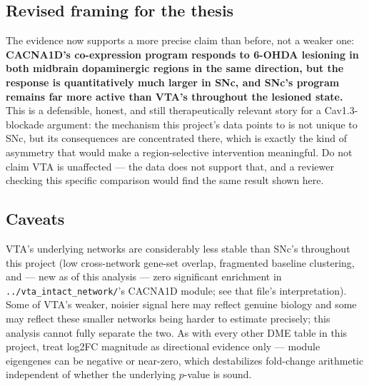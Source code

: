 \documentclass[11pt]{article}
\begin{document}
\subsection*{Revised framing for the thesis}

The evidence now supports a more precise claim than before, not a weaker one:
\textbf{CACNA1D's co-expression program responds to 6-OHDA lesioning in both midbrain
dopaminergic regions in the same direction, but the response is quantitatively much larger
in SNc, and SNc's program remains far more active than VTA's throughout the lesioned state.}
This is a defensible, honest, and still therapeutically relevant story for a Cav1.3-blockade
argument: the mechanism this project's data points to is not unique to SNc, but its
consequences are concentrated there, which is exactly the kind of asymmetry that would make
a region-selective intervention meaningful. Do not claim VTA is unaffected --- the data does
not support that, and a reviewer checking this specific comparison would find the same
result shown here.

\subsection*{Caveats}

VTA's underlying networks are considerably less stable than SNc's throughout this project
(low cross-network gene-set overlap, fragmented baseline clustering, and --- new as of this
analysis --- zero significant enrichment in \texttt{../vta\_intact\_network/}'s CACNA1D
module; see that file's interpretation). Some of VTA's weaker, noisier signal here may
reflect genuine biology and some may reflect these smaller networks being harder to
estimate precisely; this analysis cannot fully separate the two. As with every other DME
table in this project, treat log2FC magnitude as directional evidence only --- module
eigengenes can be negative or near-zero, which destabilizes fold-change arithmetic
independent of whether the underlying $p$-value is sound.
\end{document}
